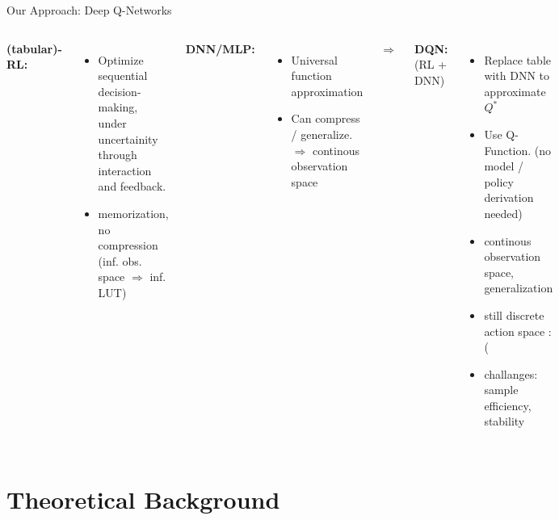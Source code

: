 \documentclass[aspectratio=169]{beamer}
\begin{document}
\begin{frame}{Our Approach: Deep Q-Networks}
  \begin{columns}[c]
      {
        \textbf{(tabular)-RL:}
        \begin{itemize}
          \item Optimize sequential decision-making, under uncertainity through interaction and feedback.
          \item memorization, no compression (inf. obs. space $\Rightarrow$ inf. LUT)
        \end{itemize}
        \textbf{DNN/MLP:}
        \begin{itemize}
          \item Universal function approximation
          \item {Can compress / generalize. \\
            $\Rightarrow$ continous observation space
          }
        \end{itemize}
      }

      \centering
      {
        \Huge $\Rightarrow$
      }

      {
        \textbf{DQN:} (RL + DNN)
        \begin{itemize}
          \item Replace table with DNN to approximate $Q^*$
          \item Use Q-Function. (no model / policy derivation needed)
          \item[$\Rightarrow$]  continous observation space, generalization
          \item[$\Rightarrow$]  still discrete action space :(
          \item[$\Rightarrow$]  challanges: sample efficiency, stability
        \end{itemize}
      }
  \end{columns}
\end{frame}

\section{Theoretical Background}
\end{document}
